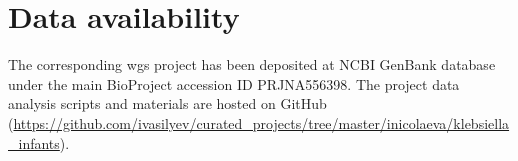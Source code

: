 \section{Data availability}\label{sec:data}
The corresponding \gls{wgs} project has been deposited at NCBI GenBank database under the main
BioProject accession ID PRJNA556398.
The project data analysis scripts and materials are hosted on GitHub
(\url{https://github.com/ivasilyev/curated_projects/tree/master/inicolaeva/klebsiella_infants}).
